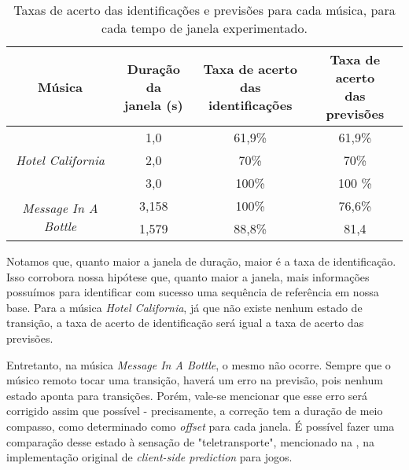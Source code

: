 \begin{table}[ht!]
    \centering
    \begin{tabular}{|c|c|c|c|}
        \hline
        Música & \makecell{Duração da \\ janela (s)} & \makecell{Taxa de acerto \\ das identificações} & \makecell{Taxa de acerto \\ das previsões}\\
        
        \hline
        \hline
        
        \multirow{3}{5em}{\centering \textit{Hotel California}} & 1,0 & 61,9\% & 61,9\% \\ 
        \cline{2-4}
        
        & 2,0 & 70\% & 70\% \\ 
        \cline{2-4}
        
        & 3,0 & 100\% & 100 \% \\ 
        
        \hline
        
        \multirow{2}{5em}{\centering \textit{Message In A Bottle}} & 3,158 & 100\% & 76,6\% \\ 
        \cline{2-4}
        
        & 1,579 & 88,8\% & 81,4 \\ 
        \cline{2-4}
        
        \hline
    \end{tabular}
    \caption{Taxas de acerto das identificações e previsões para cada música, para cada tempo de janela experimentado.}
    \label{tab:dtw_results_correctness}
\end{table}

Notamos que, quanto maior a janela de duração, maior é a taxa de identificação. Isso corrobora nossa hipótese que, quanto maior a janela, mais informações possuímos para identificar com sucesso uma sequência de referência em nossa base. Para a música \textit{Hotel California}, já que não existe nenhum estado de transição, a taxa de acerto de identificação será igual a taxa de acerto das previsões.

Entretanto, na música \textit{Message In A Bottle}, o mesmo não ocorre. Sempre que o músico remoto tocar uma transição, haverá um erro na previsão, pois nenhum estado aponta para transições. Porém, vale-se mencionar que esse erro será corrigido assim que possível - precisamente, a correção tem a duração de meio compasso, como determinado como \textit{offset} para cada janela. É possível fazer uma comparação desse estado à sensação de "teletransporte", mencionado na , na implementação original de \textit{client-side prediction} para jogos.

